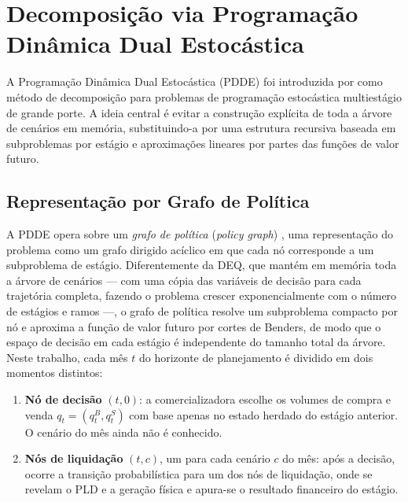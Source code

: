 \section{Decomposi\c{c}\~ao via Programa\c{c}\~ao Din\^amica Dual Estoc\'astica}
\label{sec:pdde}

A Programa\c{c}\~ao Din\^amica Dual Estoc\'astica (PDDE) foi introduzida por  como m\'etodo de decomposi\c{c}\~ao para problemas de programa\c{c}\~ao estoc\'astica multiestágio de grande porte. A ideia central \'e evitar a constru\c{c}\~ao expl\'icita de toda a \'arvore de cen\'arios em mem\'oria, substituindo-a por uma estrutura recursiva baseada em subproblemas por est\'agio e aproxima\c{c}\~oes lineares por partes das fun\c{c}\~oes de valor futuro.

\subsection{Representa\c{c}\~ao por Grafo de Pol\'itica}
\label{subsec:policy_graph}

A PDDE opera sobre um \emph{grafo de pol\'itica} (\textit{policy graph}) \cite{dowson2021}, uma representa\c{c}\~ao do problema como um grafo dirigido ac\'iclico em que cada n\'o corresponde a um subproblema de est\'agio. Diferentemente da DEQ, que mant\'em em mem\'oria toda a \'arvore de cen\'arios --- com uma c\'opia das vari\'aveis de decis\~ao para cada trajet\'oria completa, fazendo o problema crescer exponencialmente com o n\'umero de est\'agios e ramos ---, o grafo de pol\'itica resolve um subproblema compacto por n\'o e aproxima a fun\c{c}\~ao de valor futuro por cortes de Benders, de modo que o espa\c{c}o de decis\~ao em cada est\'agio \'e independente do tamanho total da \'arvore. Neste trabalho, cada m\^es $t$ do horizonte de planejamento \'e dividido em dois momentos distintos:

\begin{enumerate}
  \item \textbf{N\'o de decis\~ao} $(t, 0)$: a comercializadora escolhe os volumes de compra e venda $q_t = (q^B_t, q^S_t)$ com base apenas no estado herdado do est\'agio anterior. O cen\'ario do m\^es ainda n\~ao \'e conhecido.
  \item \textbf{N\'os de liquida\c{c}\~ao} $(t, c)$, um para cada cen\'ario $c$ do m\^es: ap\'os a decis\~ao, ocorre a transi\c{c}\~ao probabil\'istica para um dos n\'os de liquida\c{c}\~ao, onde se revelam o PLD e a gera\c{c}\~ao f\'isica e apura-se o resultado financeiro do est\'agio.
\end{enumerate}

